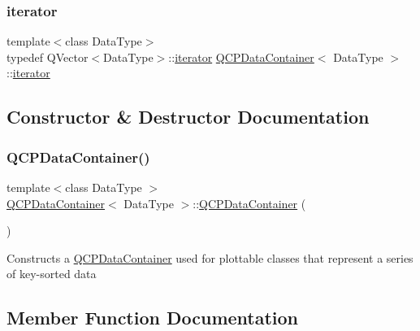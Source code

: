 \subsubsection{\texorpdfstring{iterator}{iterator}}
{\footnotesize\ttfamily template$<$class Data\+Type$>$ \\
typedef Q\+Vector$<$Data\+Type$>$\+::\mbox{\hyperlink{class_q_c_p_data_container_a1bb453c3ae37d1ee5268878acb3a9d29}{iterator}} \mbox{\hyperlink{class_q_c_p_data_container}{Q\+C\+P\+Data\+Container}}$<$ Data\+Type $>$\+::\mbox{\hyperlink{class_q_c_p_data_container_a1bb453c3ae37d1ee5268878acb3a9d29}{iterator}}}



\subsection{Constructor \& Destructor Documentation}
\mbox{\label{class_q_c_p_data_container_af86c0c63719f92c360ff67cc06c6fe6f}} 
\subsubsection{\texorpdfstring{QCPDataContainer()}{QCPDataContainer()}}
{\footnotesize\ttfamily template$<$class Data\+Type $>$ \\
\mbox{\hyperlink{class_q_c_p_data_container}{Q\+C\+P\+Data\+Container}}$<$ Data\+Type $>$\+::\mbox{\hyperlink{class_q_c_p_data_container}{Q\+C\+P\+Data\+Container}} (\begin{DoxyParamCaption}{ }\end{DoxyParamCaption})}

Constructs a \mbox{\hyperlink{class_q_c_p_data_container}{Q\+C\+P\+Data\+Container}} used for plottable classes that represent a series of key-\/sorted data 

\subsection{Member Function Documentation}
\mbox{\label{class_q_c_p_data_container_a42b98bd994307ccd163a43d576f91ad9}} 
